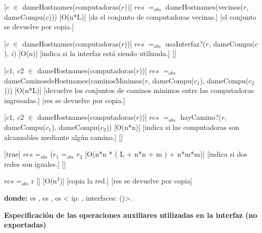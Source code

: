 \begin{Interfaz}
  [$c$ $\in$ dameHostnames(computadoras($r$))]
  {$res$ $=_{obs}$ dameHostnames(vecinos($r$, dameCompu($c$)))}
  [O(n*L)]
  [da el conjunto de computadoras vecinas.]
  [el conjunto se devuelve por copia.]

  [$c$ $\in$ dameHostnames(computadoras($r$))]
  {$res$ $=_{obs}$ usaInterfaz?($r$, dameCompu($c$), $i$)}
  [O(n)]
  [indica si la interfaz est\'a siendo utilizada.]
  []

  [$c1,\ c2$ $\in$ dameHostnames(computadoras($r$))]
  {$res$ $=_{obs}$ dameCaminosdeHostnames(caminosMinimos($r$, dameCompu($c_1$), dameCompu($c_2$)))}
  [O(n*L)]
  [devuelve los conjuntos de caminos minimos entre las computadoras ingresadas.]
  [res se devuelve por copia.]
  
  [$c1,\ c2$ $\in$ dameHostnames(computadoras($r$))]
  {$res$ $=_{obs}$ hayCamino?($r$, dameCompu($c_1$), dameCompu($c_2$))}
  [O(n*n)]
  [indica si las computadoras son alcanzables mediante alg\'un camino.]
  []
  
  [true]
  {$res$ =$_{obs}$ ($r_1$ =$_{obs}$ $r_2$}%
  [O(n*n * ( L + n*n + m ) + n*m*m)]
  [indica si dos redes son iguales.]
  [] 
  
  {$res$ =$_{obs}$ r}
  []
  [O(n$^{3}$)]
  [copia la red.]
  [res se devuelve por copia]
  
   \textbf{donde:} \newline 
    es , \newline
    es , \newline
    es < ip: , interfaces: ()>.
   
\end{Interfaz}

\textbf{} %

\textbf{Especificaci\'on de las operaciones auxiliares utilizadas en la interfaz (no exportadas)}

